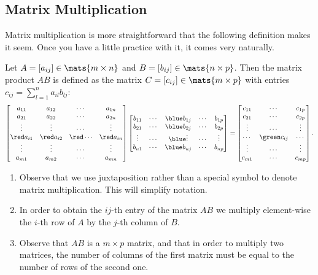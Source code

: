 \subsection{Matrix Multiplication}\label{subsec:matMul}

Matrix multiplication is more straightforward that the following definition
makes it seem. Once you have a little practice with it, it comes very naturally.
\begin{df}
Let $A = [a_{ij}] \in \mats{m\times n}$ and $B = [b_{ij}] \in
\mats{n\times p}$. Then the matrix product $AB$ is defined as
the matrix $C = [c_{ij}]\in \mats{m\times p}$ with entries
$c_{ij} = \sum _{l=1} ^{n} a_{il} b_{lj}$:
$$\begin{bmatrix}a_{11} & a_{12} & \cdots & a_{1n} \cr a_{21} & a_{22} & \cdots & a_{2n}
\cr \vdots & \vdots & \cdots & \vdots  \cr  {\red a_{i1}} & {\red
a_{i2}} & {\red \cdots} & {\red a_{in}}\cr  \vdots & \vdots &
\cdots & \vdots \cr a_{m1} & a_{m2} & \cdots & a_{mn} \cr
\end{bmatrix}\begin{bmatrix}b_{11} &\cdots & {\blue b_{1j}} & \cdots & b_{1p}
\cr b_{21} &\cdots & {\blue b_{2j}} & \cdots & b_{2p} \cr \vdots
&\cdots & {\blue \vdots} & \cdots & \vdots \cr b_{n1} &\cdots &
{\blue b_{nj}} & \cdots & b_{np} \cr
\end{bmatrix} = \begin{bmatrix} c_{11} & \cdots & c_{1p} \cr c_{21} & \cdots & c_{2p} \cr
 \vdots & \cdots & \vdots \cr
 \cdots & {\green c_{ij}} & \cdots \cr \vdots & \cdots & \vdots \cr c_{m1} & \cdots & c_{mp} \cr\end{bmatrix}.$$
\end{df}
\begin{rem}
\begin{enumerate}
\item
Observe that we use juxtaposition rather than a special symbol to
denote matrix multiplication. This will simplify notation.
\item
In order
to obtain the $ij$-th entry of the matrix $AB$ we multiply
element-wise the $i$-th row of $A$ by the $j$-th column of $B$.
\item
Observe that $AB$ is a $m\times p$ matrix, and that in order
to multiply two matrices, the number of columns of the first 
matrix must be equal to the number of rows of the second one.
\end{enumerate}
\end{rem}


